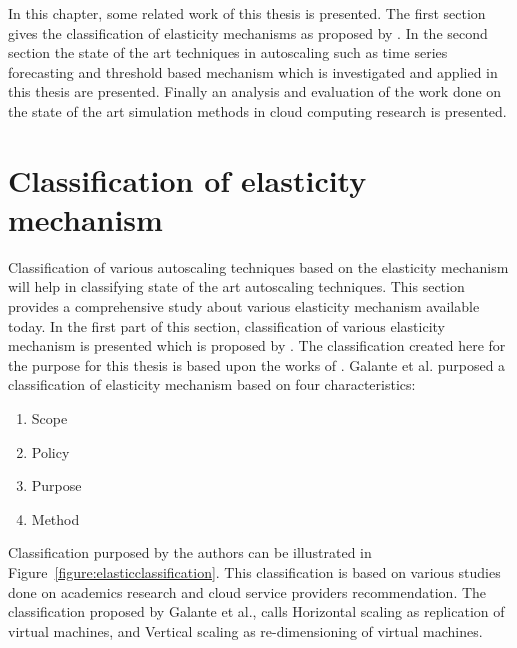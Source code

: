 In this chapter, some related work of this thesis is presented. The first section gives the classification of elasticity mechanisms as proposed by \cite{galante2012survey} \cite{dawoud2013scalability} \cite{lorido2012auto}. In the second section the state of the art techniques in autoscaling such as time series forecasting and threshold based mechanism which is investigated and applied in this thesis are presented. Finally an analysis and evaluation of the work done on the state of the art simulation methods in cloud computing research is presented.

\section{Classification of elasticity mechanism}
\label{sec:Classification of elasticity mechanism}
Classification of various autoscaling techniques based on the elasticity mechanism will help in classifying state of the art autoscaling techniques. This section provides a comprehensive study about various elasticity mechanism available today. In the first part of this section, classification of various elasticity mechanism  is presented which is proposed by \cite{galante2012survey} \cite{dawoud2013scalability} \cite{lorido2012auto}. The classification created here for the purpose for this thesis is based upon the works of \cite{galante2012survey} \cite{dawoud2013scalability} \cite{lorido2012auto}. Galante et al.\cite{galante2012survey} purposed a classification of elasticity mechanism based on four characteristics:
\begin{enumerate}
  \item Scope
  \item Policy
  \item Purpose
  \item Method
\end{enumerate}
Classification purposed by the authors can be illustrated in Figure~\ref{figure:elasticclassification}. This classification is based on various studies done on academics research and cloud service providers recommendation. The classification proposed by Galante et al.\cite{galante2012survey}, calls Horizontal scaling as replication of virtual machines, and Vertical scaling as re-dimensioning of virtual machines.

